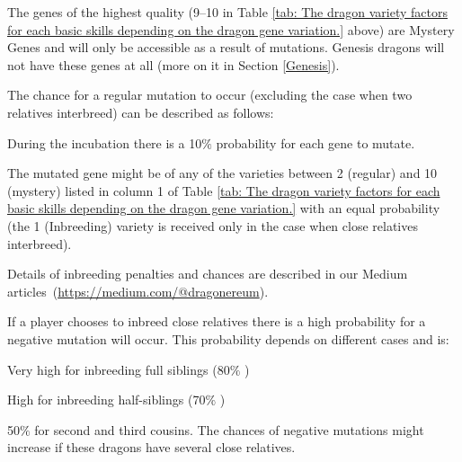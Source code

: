 \documentclass[12pt]{article}
\begin{document}
The genes of the highest quality (9–10 in  Table \ref{tab: The dragon variety factors for each basic skills depending on the dragon gene variation.} above) are Mystery Genes and will only be accessible as a result of mutations. Genesis dragons will not have these genes at all (more on it in Section \ref{Genesis}).\par

The chance for a regular mutation to occur (excluding the case when two relatives interbreed) can be described as follows:\par

\begin{itemize}
  \begin{samepage}
	\item During the incubation there is a 10$\%$  probability for each gene to mutate.\par

	\item The mutated gene might be of any of the varieties between 2 (regular) and 10 (mystery) listed in column 1 of  Table \ref{tab: The dragon variety factors for each basic skills depending on the dragon gene variation.} with an equal probability (the 1 (Inbreeding) variety is received only in the case when close relatives interbreed).\par
  \end{samepage}
\end{itemize}

Details of inbreeding penalties and chances are described in our Medium  \mbox{articles (\url{https://medium.com/@dragonereum})}. \par

If a player chooses to inbreed close relatives there is a high probability for a negative mutation will occur. This probability depends on different cases and is:\par

\begin{itemize}
  \begin{samepage}
	\item Very high for inbreeding full siblings (80$\%$ )\par

	\item High for inbreeding half-siblings (70$\%$ )\par

	\item 50$\%$  for second and third cousins. The chances of negative mutations might increase if these dragons have several close relatives. 
  \end{samepage}
\end{itemize}\par
\end{document}

